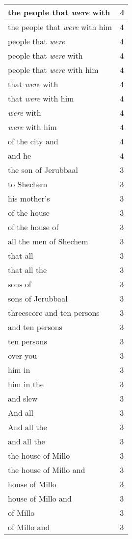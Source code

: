 \begin{center}
\begin{longtable}{|p{3.0in}|p{0.5in}|}
the people that \emph{were} with & 4\\ \hline 
the people that \emph{were} with him & 4\\ \hline 
people that \emph{were} & 4\\ \hline 
people that \emph{were} with & 4\\ \hline 
people that \emph{were} with him & 4\\ \hline 
that \emph{were} with & 4\\ \hline 
that \emph{were} with him & 4\\ \hline 
\emph{were} with & 4\\ \hline 
\emph{were} with him & 4\\ \hline 
of the city and & 4\\ \hline 
and he & 4\\ \hline 
the son of Jerubbaal & 3\\ \hline 
to Shechem & 3\\ \hline 
his mother's & 3\\ \hline 
of the house & 3\\ \hline 
of the house of & 3\\ \hline 
all the men of Shechem & 3\\ \hline 
that all & 3\\ \hline 
that all the & 3\\ \hline 
sons of & 3\\ \hline 
sons of Jerubbaal & 3\\ \hline 
threescore and ten persons & 3\\ \hline 
and ten persons & 3\\ \hline 
ten persons & 3\\ \hline 
over you & 3\\ \hline 
him in & 3\\ \hline 
him in the & 3\\ \hline 
and slew & 3\\ \hline 
And all & 3\\ \hline 
And all the & 3\\ \hline 
and all the & 3\\ \hline 
the house of Millo & 3\\ \hline 
the house of Millo and & 3\\ \hline 
house of Millo & 3\\ \hline 
house of Millo and & 3\\ \hline 
of Millo & 3\\ \hline 
of Millo and & 3\\ \hline 

\end{longtable}
\end{center}
